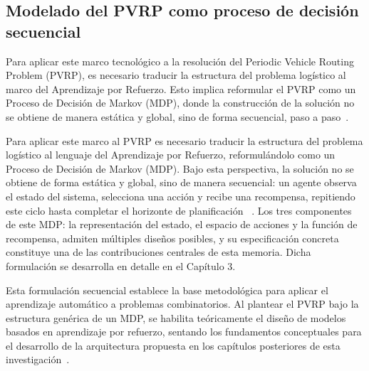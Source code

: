 
\subsection{Modelado del PVRP como proceso de decisión secuencial} \label{sec:Modelado}
Para aplicar este marco tecnológico a la resolución del Periodic Vehicle Routing Problem (PVRP), es necesario traducir la estructura del problema logístico al marco del Aprendizaje por Refuerzo. Esto implica reformular el PVRP como un Proceso de Decisión de Markov (MDP), donde la construcción de la solución no se obtiene de manera estática y global, sino de forma secuencial, paso a paso~\cite{SuttonBarto2014, bengio2020machinelearningcombinatorialoptimization}.

Para aplicar este marco al PVRP es necesario traducir la estructura del problema logístico al lenguaje del Aprendizaje por Refuerzo, reformulándolo como un Proceso de Decisión de Markov (MDP). Bajo esta perspectiva, la solución no se obtiene de forma estática y global, sino de manera secuencial: un agente observa el estado del sistema, selecciona una acción y recibe una recompensa, repitiendo este ciclo hasta completar el horizonte de planificación ~\cite{SuttonBarto2014, bengio2020machinelearningcombinatorialoptimization}. Los tres componentes de este MDP: la representación del estado, el espacio de acciones y la función de recompensa, admiten múltiples diseños posibles, y su especificación concreta constituye una de las contribuciones centrales de esta memoria. Dicha formulación se desarrolla en detalle en el Capítulo 3.

Esta formulación secuencial establece la base metodológica para aplicar el aprendizaje automático a problemas combinatorios. Al plantear el PVRP bajo la estructura genérica de un MDP, se habilita teóricamente el diseño de modelos basados en aprendizaje por refuerzo, sentando los fundamentos conceptuales para el desarrollo de la arquitectura propuesta en los capítulos posteriores de esta investigación~\cite{bengio2020machinelearningcombinatorialoptimization, bertsimas2018predictiveprescriptiveanalytics}.



